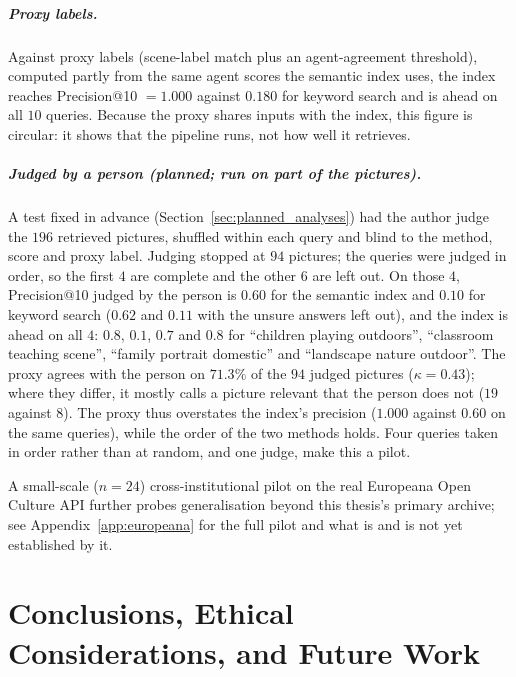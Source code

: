 \documentclass[12pt,a4paper]{report}
\begin{document}
\paragraph{Proxy labels.} Against proxy labels (scene-label match plus an agent-agreement threshold), computed partly from the same agent scores the semantic index uses, the index reaches Precision@10 $=1.000$ against $0.180$ for keyword search and is ahead on all $10$ queries. Because the proxy shares inputs with the index, this figure is circular: it shows that the pipeline runs, not how well it retrieves.

\paragraph{Judged by a person (planned; run on part of the pictures).} A test fixed in advance (Section~\ref{sec:planned_analyses}) had the author judge the $196$ retrieved pictures, shuffled within each query and blind to the method, score and proxy label. Judging stopped at $94$ pictures; the queries were judged in order, so the first $4$ are complete and the other $6$ are left out. On those $4$, Precision@10 judged by the person is $0.60$ for the semantic index and $0.10$ for keyword search ($0.62$ and $0.11$ with the unsure answers left out), and the index is ahead on all $4$: $0.8$, $0.1$, $0.7$ and $0.8$ for ``children playing outdoors'', ``classroom teaching scene'', ``family portrait domestic'' and ``landscape nature outdoor''. The proxy agrees with the person on $71.3\%$ of the $94$ judged pictures ($\kappa = 0.43$); where they differ, it mostly calls a picture relevant that the person does not ($19$ against $8$). The proxy thus overstates the index's precision ($1.000$ against $0.60$ on the same queries), while the order of the two methods holds. Four queries taken in order rather than at random, and one judge, make this a pilot.

A small-scale ($n=24$) cross-institutional pilot on the real Europeana Open Culture API further probes generalisation beyond this thesis's primary archive; see Appendix~\ref{app:europeana} for the full pilot and what is and is not yet established by it.

\chapter{Conclusions, Ethical Considerations, and Future Work}
\label{ch:conclusions}
\end{document}

